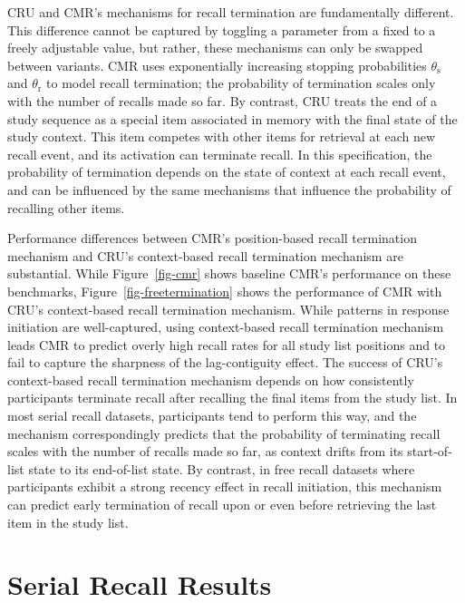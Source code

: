 \documentclass[
  letterpaper,
  11pt,
  english,
  singlespacing,
  headsepline]{MastersDoctoralThesis}
\begin{document}
CRU and CMR's mechanisms for recall termination are fundamentally
different. This difference cannot be captured by toggling a parameter
from a fixed to a freely adjustable value, but rather, these mechanisms
can only be swapped between variants. CMR uses exponentially increasing
stopping probabilities \(\theta_\text{s}\) and \(\theta_\text{r}\) to
model recall termination; the probability of termination scales only
with the number of recalls made so far. By contrast, CRU treats the end
of a study sequence as a special item associated in memory with the
final state of the study context. This item competes with other items
for retrieval at each new recall event, and its activation can terminate
recall. In this specification, the probability of termination depends on
the state of context at each recall event, and can be influenced by the
same mechanisms that influence the probability of recalling other items.

Performance differences between CMR's position-based recall termination
mechanism and CRU's context-based recall termination mechanism are
substantial. While Figure~\ref{fig-cmr} shows baseline CMR's performance
on these benchmarks, Figure~\ref{fig-freetermination} shows the
performance of CMR with CRU's context-based recall termination
mechanism. While patterns in response initiation are well-captured,
using context-based recall termination mechanism leads CMR to predict
overly high recall rates for all study list positions and to fail to
capture the sharpness of the lag-contiguity effect. The success of CRU's
context-based recall termination mechanism depends on how consistently
participants terminate recall after recalling the final items from the
study list. In most serial recall datasets, participants tend to perform
this way, and the mechanism correspondingly predicts that the
probability of terminating recall scales with the number of recalls made
so far, as context drifts from its start-of-list state to its
end-of-list state. By contrast, in free recall datasets where
participants exhibit a strong recency effect in recall initiation, this
mechanism can predict early termination of recall upon or even before
retrieving the last item in the study list.

\section{Serial Recall Results}\label{serial-recall-results}
\end{document}
